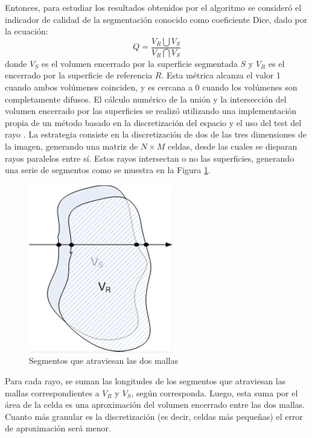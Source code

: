 Entonces, para estudiar los resultados obtenidos por el algoritmo se consideró el indicador de calidad de la segmentación conocido como coeficiente Dice, dado por la ecuación:
%
\begin{equation}
Q = \dfrac{V_{R}\bigcup V_{S}}{V_{R}\bigcap V_{S}}
\end{equation}
%
donde $V_{S}$ es el volumen encerrado por la superficie segmentada $S$ y $V_{R}$ es el encerrado por la superficie de referencia $R$. Esta métrica alcanza el valor 1 cuando ambos volúmenes coinciden, y es cercana a 0 cuando los volúmenes son completamente difusos. El cálculo numérico de la unión y la intersección del volumen encerrado por las superficies se realizó utilizando una implementación propia de un método basado en la discretización del espacio y el uso del test del rayo \citep{foley1994introduction, d2008indicador}. La estrategia consiste en la discretización de dos de las tres dimensiones de la imagen, generando una matriz de $ N \times M $ celdas, desde las cuales se disparan rayos paralelos entre sí. Estos rayos intersectan o no las superficies, generando una serie de segmentos como se muestra en la Figura \ref{fig:discretizacionvolumen}.

\begin{figure}[H]
\centering
\includegraphics[scale=0.7]{images/calculo_indicador.png}
\caption{Segmentos que atraviesan las dos mallas}
\label{fig:discretizacionvolumen}
\end{figure}

Para cada rayo, se suman las longitudes de los segmentos que atraviesan las mallas correspondientes a $V_{R}$ y $V_{S}$, según corresponda. Luego, esta suma por el área de la celda es una aproximación del volumen encerrado entre las dos mallas. Cuanto más granular es la discretización (es decir, celdas más pequeñas) el error de aproximación será menor.

